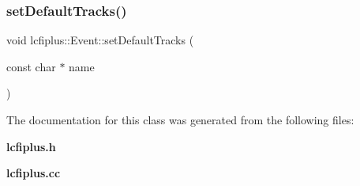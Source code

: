 \subsubsection{set\+Default\+Tracks()}
{\footnotesize\ttfamily void lcfiplus\+::\+Event\+::set\+Default\+Tracks (\begin{DoxyParamCaption}\item[{const char $\ast$}]{name }\end{DoxyParamCaption})\hspace{0.3cm}{\ttfamily [inline]}}



The documentation for this class was generated from the following files\+:\begin{DoxyCompactItemize}
\item 
\textbf{ lcfiplus.\+h}\item 
\textbf{ lcfiplus.\+cc}\end{DoxyCompactItemize}
